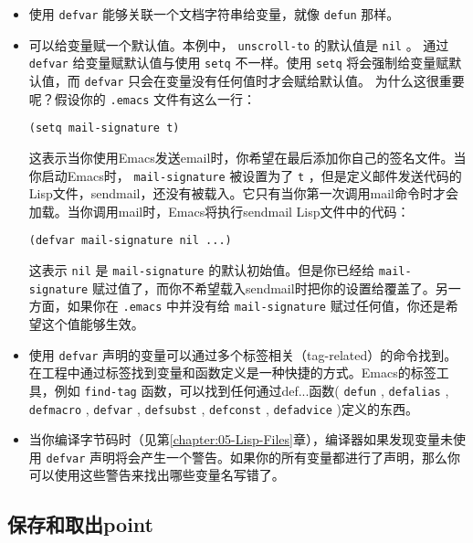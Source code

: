 \begin{itemize}
  \item 使用 \texttt{defvar} 能够关联一个文档字符串给变量，就像 \texttt{defun} 那样。
  \item 可以给变量赋一个默认值。本例中， \texttt{unscroll-to} 的默认值是 \texttt{nil} 。
通过 \texttt{defvar} 给变量赋默认值与使用 \texttt{setq} 不一样。使用 \texttt{setq} 将会强制给变量赋默认值，而 \texttt{defvar} 只会在变量没有任何值时才会赋给默认值。
为什么这很重要呢？假设你的 \verb|.emacs| 文件有这么一行：
\begin{verbatim}
(setq mail-signature t)
\end{verbatim}
这表示当你使用Emacs发送email时，你希望在最后添加你自己的签名文件。当你启动Emacs时， \texttt{mail-signature} 被设置为了 \texttt{t} ，但是定义邮件发送代码的Lisp文件，sendmail，还没有被载入。它只有当你第一次调用mail命令时才会加载。当你调用mail时，Emacs将执行sendmail Lisp文件中的代码：
\begin{verbatim}
(defvar mail-signature nil ...)
\end{verbatim}
这表示 \texttt{nil} 是 \texttt{mail-signature} 的默认初始值。但是你已经给 \texttt{mail-signature} 赋过值了，而你不希望载入sendmail时把你的设置给覆盖了。另一方面，如果你在 \verb|.emacs| 中并没有给 \texttt{mail-signature} 赋过任何值，你还是希望这个值能够生效。
  \item 使用 \texttt{defvar} 声明的变量可以通过多个标签相关（tag-related）的命令找到。在工程中通过标签找到变量和函数定义是一种快捷的方式。Emacs的标签工具，例如 \texttt{find-tag} 函数，可以找到任何通过def...函数( \texttt{defun} , \texttt{defalias} , \texttt{defmacro} , \texttt{defvar} , \texttt{defsubst} , \texttt{defconst} , \texttt{defadvice} )定义的东西。
  \item 当你编译字节码时（见第\ref{chapter:05-Lisp-Files}章），编译器如果发现变量未使用 \texttt{defvar} 声明将会产生一个警告。如果你的所有变量都进行了声明，那么你可以使用这些警告来找出哪些变量名写错了。
\end{itemize}

\subsection{保存和取出point}
\label{section:03-Saving-and-Restoring-Point}

